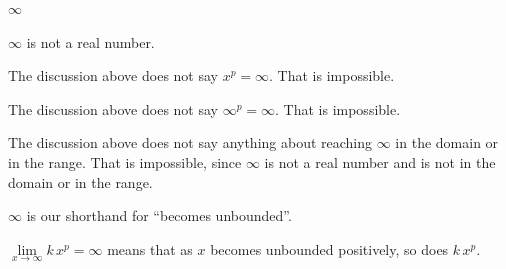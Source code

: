 \documentclass{ximera}
\begin{document}
\begin{warning} \textbf{\textcolor{red!70!black}{$\infty$}}

$\infty$ is not a real number.

The discussion above does not say $x^p =  \infty$.  That is impossible.

The discussion above does not say $\infty^p =  \infty$.  That is impossible.


The discussion above does not say anything about reaching $\infty$ in the domain or in the range. That is impossible, since $\infty$ is not a real number and is not in the domain or in the range.

$\infty$ is our shorthand for ``becomes unbounded''.


$\lim\limits_{x \to \infty} k \, x^p =  \infty$ means that as $x$ becomes unbounded positively, so does $k \, x^p$.


\end{warning}
\end{document}
